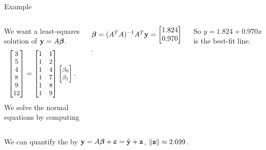 \documentclass[xcolor=dvipsnames,aspectratio=169,t]{beamer}
\begin{document}
\begin{frame}{Example}
\begin{columns}[T]
  We want a least-squares solution of $\mathbf{y}=A\boldsymbol\beta$.
  \[
    \small
    \begin{bmatrix} 3 \\ 5 \\ 4 \\ 8 \\ 9 \\ 12 \end{bmatrix}
    =
    \begin{bmatrix}
      1 & 1 \\
      1 & 2 \\
      1 & 4 \\
      1 & 7 \\
      1 & 8 \\
      1 & 9
    \end{bmatrix}
    \begin{bmatrix} \beta_0 \\ \beta_1 \end{bmatrix}.
  \]
  \pause
  We solve the \alert{normal equations} by computing
  
  \hspace*{3em} $\boldsymbol\beta =(A^T A)^{-1} A^T \mathbf{y} = 
    \begin{bmatrix} 1.824 \\ 0.970 \end{bmatrix}$.
  \smallskip
  
  So $y=1.824 + 0.970x$ is the \alert{best-fit line}.
  \end{columns}
  \bigskip
  
  \pause
  We can quantify the  by $\mathbf{y} = A\boldsymbol\beta + \boldsymbol\varepsilon = \hat{\mathbf{y}}+ \mathbf{z}$, $\|\mathbf{z}\| \approx 2.699$.
\end{frame}
\end{document}
